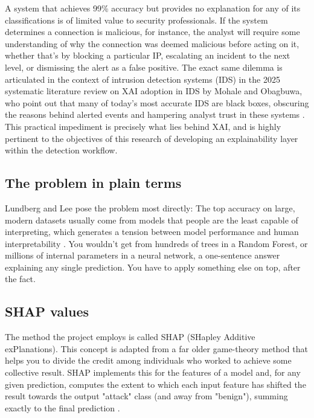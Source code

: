 A system that achieves 99\% accuracy but provides no explanation for any of its classifications is of limited value to security professionals. If the system determines a connection is malicious, for instance, the analyst will require some understanding of why the connection was deemed malicious before acting on it, whether that’s by blocking a particular IP, escalating an incident to the next level, or dismissing the alert as a false positive. The exact same dilemma is articulated in the context of intrusion detection systems (IDS) in the 2025 systematic literature review on XAI adoption in IDS by Mohale and Obagbuwa, who point out that many of today’s most accurate IDS are black boxes, obscuring the reasons behind alerted events and hampering analyst trust in these systems \cite{mohale2025xaiids}. This practical impediment is precisely what lies behind XAI, and is highly pertinent to the objectives of this research of developing an explainability layer within the detection workflow.
 
\subsection{The problem in plain terms}
 
Lundberg and Lee pose the problem most directly: The top accuracy on large, modern
datasets usually come from models that people are the least capable of interpreting, which generates a tension between model performance and human interpretability \cite{lundberg2017shap}. You wouldn’t get from hundreds of trees in a Random Forest, or millions of internal parameters in a neural network, a one-sentence answer explaining any single prediction. You have to apply something else on top, after the fact.
 
\subsection{SHAP values}

The method the project employs is called SHAP (SHapley Additive exPlanations). This concept is adapted from a far older game-theory method that helps you to divide the credit among individuals who worked to achieve some collective result. SHAP implements this for the features of a model and, for any given prediction, computes the extent to which each input feature has shifted the result towards the output "attack" class (and away from "benign"), summing exactly to the final prediction \cite{lundberg2017shap}.

